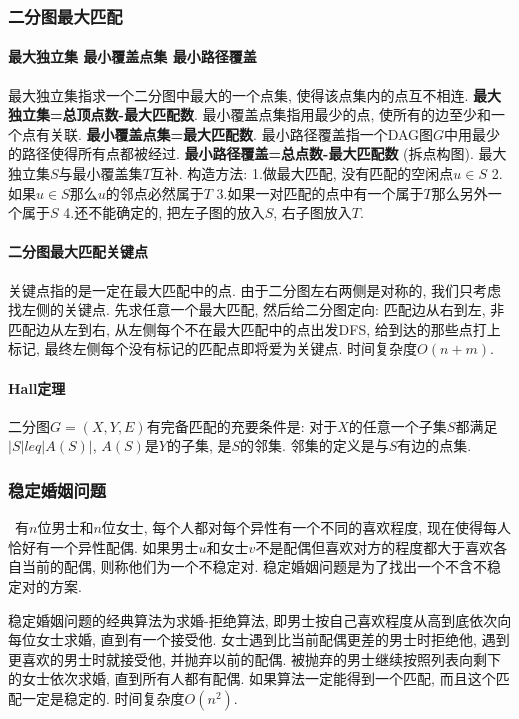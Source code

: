 \subsubsection{二分图最大匹配}
        \paragraph{最大独立集 最小覆盖点集 最小路径覆盖} 最大独立集指求一个二分图中最大的一个点集, 使得该点集内的点互不相连. \textbf{最大独立集=总顶点数-最大匹配数}. 最小覆盖点集指用最少的点, 使所有的边至少和一个点有关联. \textbf{最小覆盖点集=最大匹配数}. 最小路径覆盖指一个DAG图$G$中用最少的路径使得所有点都被经过. \textbf{最小路径覆盖=总点数-最大匹配数} (拆点构图). 最大独立集$S$与最小覆盖集$T$互补. 构造方法: 1.做最大匹配, 没有匹配的空闲点$u\in S$ 2.如果$u\in S$那么$u$的邻点必然属于$T$ 3.如果一对匹配的点中有一个属于$T$那么另外一个属于$S$ 4.还不能确定的, 把左子图的放入$S$, 右子图放入$T$.
        \paragraph{二分图最大匹配关键点} 关键点指的是一定在最大匹配中的点. 由于二分图左右两侧是对称的, 我们只考虑找左侧的关键点. 先求任意一个最大匹配, 然后给二分图定向: 匹配边从右到左, 非匹配边从左到右, 从左侧每个不在最大匹配中的点出发DFS, 给到达的那些点打上标记, 最终左侧每个没有标记的匹配点即将爱为关键点. 时间复杂度$O(n+m)$. 
        \paragraph{Hall定理}二分图$G=(X,Y,E)$有完备匹配的充要条件是: 对于$X$的任意一个子集$S$都满足$|S|leq |A(S)|$, $A(S)$是$Y$的子集, 是$S$的邻集. 邻集的定义是与$S$有边的点集. 

\subsubsection{稳定婚姻问题}\
         有$n$位男士和$n$位女士, 每个人都对每个异性有一个不同的喜欢程度, 现在使得每人恰好有一个异性配偶. 如果男士$u$和女士$v$不是配偶但喜欢对方的程度都大于喜欢各自当前的配偶, 则称他们为一个不稳定对. 稳定婚姻问题是为了找出一个不含不稳定对的方案. 
         \par 稳定婚姻问题的经典算法为求婚-拒绝算法, 即男士按自己喜欢程度从高到底依次向每位女士求婚, 直到有一个接受他. 女士遇到比当前配偶更差的男士时拒绝他, 遇到更喜欢的男士时就接受他, 并抛弃以前的配偶. 被抛弃的男士继续按照列表向剩下的女士依次求婚, 直到所有人都有配偶. 如果算法一定能得到一个匹配, 而且这个匹配一定是稳定的. 时间复杂度$O(n^2)$. 

